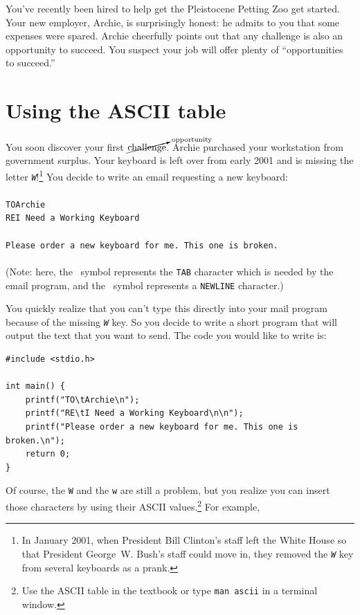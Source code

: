 You've recently been hired to help get the Pleistocene Petting Zoo get started.
Your new employer, Archie, is surprisingly honest: he admits to you that some
expenses were spared. Archie cheerfully points out that any challenge is also
an opportunity to succeed. You suspect your job will offer plenty of
``opportunities to succeed.''

\section{Using the ASCII table}

You soon discover your first
$\cancelto{\mathrm{opportunity}}{\mathrm{challenge}}$. Archie purchased your
workstation from government surplus. Your keyboard is left over from early
2001 and is missing the letter \textit{\texttt{W}}!\footnote{In January 2001,
when President Bill Clinton's staff left the White House so that President
George~W. Bush's staff could move in, they removed the \textit{\texttt{W}} key
from several keyboards as a prank.} You decide to write an email requesting a
new keyboard: \\
\\
\texttt{TO\tab Archie\nl} \\
\texttt{RE\tab I Need a Working Keyboard\nl} \\
\nl \\
\texttt{Please order a new keyboard for me. This one is broken.\nl } \\ \\
(Note: here, the \tab\ symbol represents the \texttt{TAB} character which is
needed by the email program, and the \nl\ symbol represents a \texttt{NEWLINE}
character.)

You quickly realize that you can't type this directly into your mail program
because of the missing \textit{\texttt{W}} key. So you decide to write a short
program that will output the text that you want to send. The code you would
like to write is:

\begin{lstlisting}
#include <stdio.h>

int main() {
    printf("TO\tArchie\n");
    printf("RE\tI Need a Working Keyboard\n\n");
    printf("Please order a new keyboard for me. This one is broken.\n");
    return 0;
}
\end{lstlisting}

Of course, the \texttt{W} and the \texttt{w} are still a problem, but you
realize you can insert those characters by using their ASCII
values.\footnote{Use the ASCII table in the textbook or type \texttt{man ascii}
in a terminal window.} For example,

